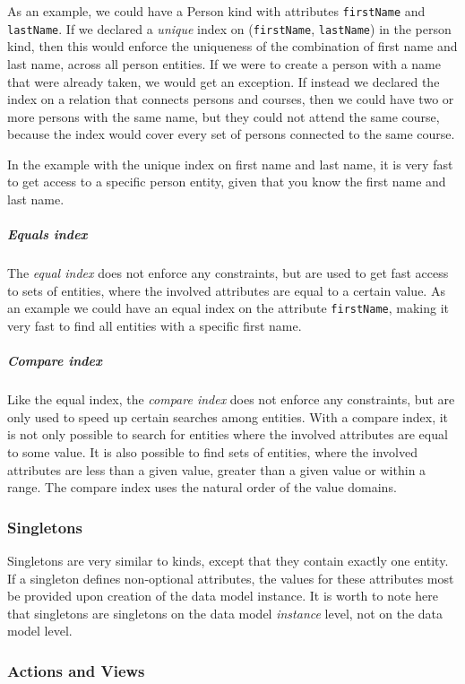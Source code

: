 As an example, we could have a Person kind with attributes \texttt{firstName}
and \texttt{lastName}. If we declared a \emph{unique} index on (\texttt{firstName},
\texttt{lastName}) in the person kind, then this would enforce the
uniqueness of the combination of first name and last name, across
all person entities. If we were to create a person with a name that
were already taken, we would get an exception. If instead we declared
the index on a relation that connects persons and courses, then we
could have two or more persons with the same name, but they could
not attend the same course, because the index would cover every set
of persons connected to the same course.

In the example with the unique index on first name and last name,
it is very fast to get access to a specific person entity, given that
you know the first name and last name.


\subparagraph{Equals index}

The \emph{equal index} does not enforce any constraints, but are used
to get fast access to sets of entities, where the involved attributes
are equal to a certain value. As an example we could have an equal
index on the attribute \texttt{firstName}, making it very fast to
find all entities with a specific first name.


\subparagraph{Compare index}

Like the equal index, the\emph{ compare index} does not enforce any
constraints, but are only used to speed up certain searches among
entities. With a compare index, it is not only possible to search
for entities where the involved attributes are equal to some value.
It is also possible to find sets of entities, where the involved attributes
are less than a given value, greater than a given value or within
a range. The compare index uses the natural order of the value domains.


\subsubsection{Singletons}

Singletons are very similar to kinds, except that they contain exactly
one entity. If a singleton defines non-optional attributes, the values
for these attributes most be provided upon creation of the data model
instance. It is worth to note here that singletons are singletons
on the data model \emph{instance} level, not on the data model level.


\subsubsection{Actions and Views}

